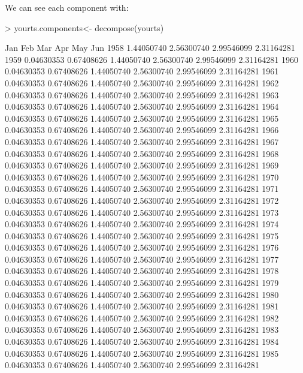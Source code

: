 \documentclass[11pt, a4paper]{article} %
\begin{document}
We can see each component with:
\begin{Schunk}
\begin{Sinput}
> yourts.components<- decompose(yourts)
\end{Sinput}
\end{Schunk}
\begin{Schunk}
\begin{Soutput}
             Jan         Feb         Mar         Apr         May         Jun
1958                          1.44050740  2.56300740  2.99546099  2.31164281
1959  0.04630353  0.67408626  1.44050740  2.56300740  2.99546099  2.31164281
1960  0.04630353  0.67408626  1.44050740  2.56300740  2.99546099  2.31164281
1961  0.04630353  0.67408626  1.44050740  2.56300740  2.99546099  2.31164281
1962  0.04630353  0.67408626  1.44050740  2.56300740  2.99546099  2.31164281
1963  0.04630353  0.67408626  1.44050740  2.56300740  2.99546099  2.31164281
1964  0.04630353  0.67408626  1.44050740  2.56300740  2.99546099  2.31164281
1965  0.04630353  0.67408626  1.44050740  2.56300740  2.99546099  2.31164281
1966  0.04630353  0.67408626  1.44050740  2.56300740  2.99546099  2.31164281
1967  0.04630353  0.67408626  1.44050740  2.56300740  2.99546099  2.31164281
1968  0.04630353  0.67408626  1.44050740  2.56300740  2.99546099  2.31164281
1969  0.04630353  0.67408626  1.44050740  2.56300740  2.99546099  2.31164281
1970  0.04630353  0.67408626  1.44050740  2.56300740  2.99546099  2.31164281
1971  0.04630353  0.67408626  1.44050740  2.56300740  2.99546099  2.31164281
1972  0.04630353  0.67408626  1.44050740  2.56300740  2.99546099  2.31164281
1973  0.04630353  0.67408626  1.44050740  2.56300740  2.99546099  2.31164281
1974  0.04630353  0.67408626  1.44050740  2.56300740  2.99546099  2.31164281
1975  0.04630353  0.67408626  1.44050740  2.56300740  2.99546099  2.31164281
1976  0.04630353  0.67408626  1.44050740  2.56300740  2.99546099  2.31164281
1977  0.04630353  0.67408626  1.44050740  2.56300740  2.99546099  2.31164281
1978  0.04630353  0.67408626  1.44050740  2.56300740  2.99546099  2.31164281
1979  0.04630353  0.67408626  1.44050740  2.56300740  2.99546099  2.31164281
1980  0.04630353  0.67408626  1.44050740  2.56300740  2.99546099  2.31164281
1981  0.04630353  0.67408626  1.44050740  2.56300740  2.99546099  2.31164281
1982  0.04630353  0.67408626  1.44050740  2.56300740  2.99546099  2.31164281
1983  0.04630353  0.67408626  1.44050740  2.56300740  2.99546099  2.31164281
1984  0.04630353  0.67408626  1.44050740  2.56300740  2.99546099  2.31164281
1985  0.04630353  0.67408626  1.44050740  2.56300740  2.99546099  2.31164281

\end{Soutput}
\end{Schunk}
\end{document}
